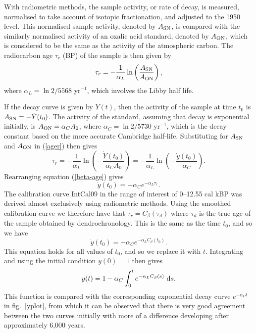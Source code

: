 \documentclass[12pt]{article}
\newcommand{\Ref}[1]{(\ref{#1})}
\newcommand{\INTCAL}{{\sc IntCal}}
\newcommand{\upd}{{\rm d}}
\begin{document}
With radiometric methods, the sample activity, or rate of decay, is
measured, normalised to take account of isotopic fractionation, and
adjusted to the 1950 level.
This normalised sample activity, denoted by $A_{\rm SN}$, is compared 
with the similarly normalised activity of an oxalic acid standard,
denoted by $A_{\rm ON}$, which is considered to be the same as the activity 
of the atmospheric carbon. The radiocarbon age
$\tau_r$ (BP) of the sample is then given by \cite{stuiver77}
\begin{equation}\label{ager}
\tau_r=-\frac{1}{\alpha_L}\ln\left(\frac{A_{\rm SN}}{A_{\rm ON}}\right),
\end{equation}
where $\alpha_L=\ln 2/5568$ yr$^{-1}$, which involves the Libby half life.

If the decay curve is given by $Y(t)$, then the activity of the sample at
time $t_0$ is $A_{\rm SN}=-\dot Y(t_0)$.
The activity of the standard, assuming that decay is exponential initially,
is $A_{\rm ON}=\alpha_C A_0$,
where $\alpha_C=\ln 2/5730$ yr$^{-1}$, which is the decay constant based on
the more accurate Cambridge half-life. Substituting for $A_{\rm SN}$ and 
$A_{\rm ON}$ in \Ref{ager} then gives
\begin{equation}\label{beta-age}
\tau_r=-\frac{1}{\alpha_L}\ln\left(-\frac{\dot Y(t_0)}{\alpha_C A_0}\right)
=-\frac{1}{\alpha_L}\ln\left(-\frac{\dot y(t_0)}{\alpha_C}\right).
\end{equation}
Rearranging equation \Ref{beta-age} gives
$$\dot y(t_0)=-\alpha_C e^{-\alpha_L\tau_r}.$$
The calibration curve \INTCAL09 in the range of interest of 
0--12.55 cal kBP was derived almost exclusively using radiometric
methods. Using the smoothed calibration curve
we therefore have that $\tau_r=C_\beta(\tau_d)$ where
$\tau_d$ is the true age of the sample obtained by dendrochronology. This
is the same as the time $t_0$, and so we have
$$\dot y(t_0)=-\alpha_C e^{-\alpha_L C_\beta(t_0)}.$$
This equation holds for all values of $t_0$, and so we replace it
with $t$. Integrating and using the initial condition $y(0)=1$ then gives
\begin{equation}\label{yt}
y(t)=1-\alpha_C \int_0^t e^{-\alpha_L C_\beta(s)}~\upd s.
\end{equation}
This function is compared with the corresponding exponential decay curve
$e^{-\alpha_C t}$ in fig.~\ref{yplot}, 
from which it can be observed that there is very good agreement between the
two curves initially with more of a difference developing after
approximately 6,000 years.
\end{document}
